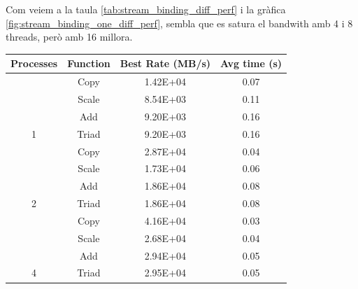 Com veiem a la taula \ref{tab:stream_binding_diff_perf} i la gràfica \ref{fig:stream_binding_one_diff_perf}, sembla que es satura el bandwith amb 4 i 8 threads, però amb 16 millora.
\begin{table}[h]
    \centering
\begin{tabular}{cccc}
Processes            & Function                     & Best Rate (MB/s)                 & Avg time (s)                 \\ \hline \hline
                     & \cellcolor[HTML]{EFEFEF}Copy & \cellcolor[HTML]{EFEFEF}1.42E+04 & \cellcolor[HTML]{EFEFEF}0.07 \\
                     & Scale                        & 8.54E+03                         & 0.11                         \\
                     & \cellcolor[HTML]{EFEFEF}Add  & \cellcolor[HTML]{EFEFEF}9.20E+03 & \cellcolor[HTML]{EFEFEF}0.16 \\
\multirow{-4}{*}{1}  & Triad                        & 9.20E+03                         & 0.16                         \\ \hline
                     & \cellcolor[HTML]{EFEFEF}Copy & \cellcolor[HTML]{EFEFEF}2.87E+04 & \cellcolor[HTML]{EFEFEF}0.04 \\
                     & Scale                        & 1.73E+04                         & 0.06                         \\
                     & \cellcolor[HTML]{EFEFEF}Add  & \cellcolor[HTML]{EFEFEF}1.86E+04 & \cellcolor[HTML]{EFEFEF}0.08 \\
\multirow{-4}{*}{2}  & Triad                        & 1.86E+04                         & 0.08                         \\ \hline
                     & \cellcolor[HTML]{EFEFEF}Copy & \cellcolor[HTML]{EFEFEF}4.16E+04 & \cellcolor[HTML]{EFEFEF}0.03 \\
                     & Scale                        & 2.68E+04                         & 0.04                         \\
                     & \cellcolor[HTML]{EFEFEF}Add  & \cellcolor[HTML]{EFEFEF}2.94E+04 & \cellcolor[HTML]{EFEFEF}0.05 \\
\multirow{-4}{*}{4}  & Triad                        & 2.95E+04                         & 0.05                         \\ \hline

\end{tabular}
\end{table}
